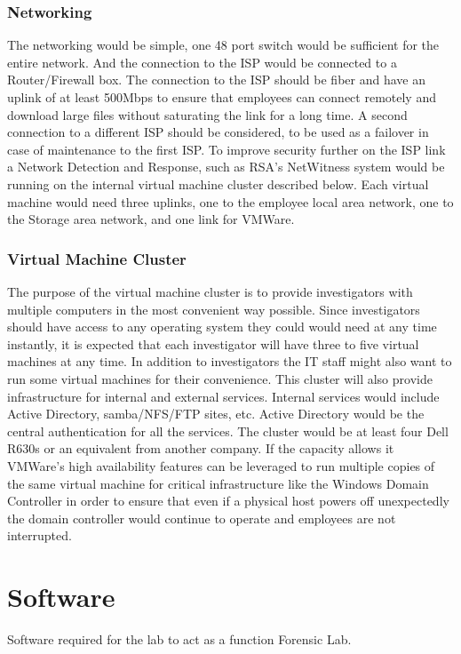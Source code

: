 \documentclass{article}
\begin{document}
\subsubsection{Networking} The networking would be simple, one 48 port switch would be sufficient for the entire network. And the connection to the ISP would be connected to a Router/Firewall box. The connection to the ISP should be fiber and have an uplink of at least 500Mbps to ensure that employees can connect remotely and download large files without saturating the link for a long time. A second connection to a different ISP should be considered, to be used as a failover in case of maintenance to the first ISP. To improve security further on the ISP link a Network Detection and Response, such as RSA's NetWitness system would be running on the internal virtual machine cluster described below. Each virtual machine would need three uplinks, one to the employee local area network, one to the Storage area network, and one link for VMWare. 
\subsubsection{Virtual Machine Cluster} The purpose of the virtual machine cluster is to provide investigators with multiple computers in the most convenient way possible. Since investigators should have access to any operating system they could would need at any time instantly, it is expected that each investigator will have three to five virtual machines at any time. In addition to investigators the IT staff might also want to run some virtual machines for their convenience. This cluster will also provide infrastructure for internal and external services. Internal services would include Active Directory, samba/NFS/FTP sites, etc. Active Directory would be the central authentication for all the services. The cluster would be at least four Dell R630s or an equivalent from another company. If the capacity allows it VMWare's high availability features can be leveraged to run multiple copies of the same virtual machine for critical infrastructure like the Windows Domain Controller in order to ensure that even if a physical host powers off unexpectedly the domain controller would continue to operate and employees are not interrupted. 


\section{Software}
Software required for the lab to act as a function Forensic Lab.
\end{document}
